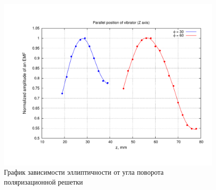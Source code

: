 \documentclass[11pt,a4paper,oneside, reqno]{amsproc}
\begin{document}
\begin{figure}[hb!]
    \begin{center}
        \includegraphics[width=\textwidth]{plot2.pdf}
    \end{center}
    \caption{График зависимости эллиптичности от угла поворота поляризационной решетки}
    \label{fig:plot3}
\end{figure}
\end{document}
